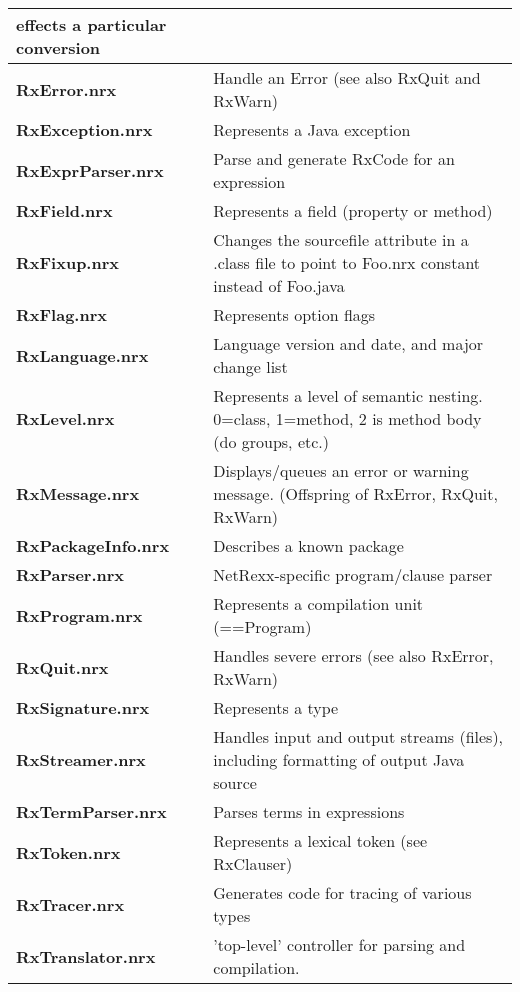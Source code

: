 \begin{table}
\begin{tabularx}{\textwidth}{>{\bfseries}lX}
                         effects a particular conversion
\\\midrule
  RxError.nrx         & Handle an Error (see also RxQuit and RxWarn)
\\\midrule
  RxException.nrx     & Represents a Java exception
\\\midrule
  RxExprParser.nrx    & Parse and generate RxCode for an expression
\\\midrule
  RxField.nrx         & Represents a field (property or method)
\\\midrule
  RxFixup.nrx         & Changes the sourcefile attribute in a .class
                         file to point to Foo.nrx constant instead of
                         Foo.java
\\\midrule
  RxFlag.nrx          & Represents option flags
\\\midrule
  RxLanguage.nrx      & Language version and date, and major change
                         list
\\\midrule
  RxLevel.nrx         & Represents a level of semantic nesting.
                         0=class, 1=method, 2  is method body (do
                         groups, etc.)
\\\midrule
  RxMessage.nrx       & Displays/queues an error or warning message.
                         (Offspring of RxError, RxQuit, RxWarn)
\\\midrule
  RxPackageInfo.nrx   & Describes a known package
\\\midrule
  RxParser.nrx        & NetRexx-specific program/clause parser
\\\midrule
  RxProgram.nrx       & Represents a compilation unit (==Program)
\\\midrule
  RxQuit.nrx          & Handles severe errors (see also RxError,
  RxWarn)
\\\midrule
  RxSignature.nrx     & Represents a type
\\\midrule
  RxStreamer.nrx      & Handles input and output streams (files),
                         including formatting of output Java source
\\\midrule
  RxTermParser.nrx    & Parses terms in expressions
\\\midrule
  RxToken.nrx         & Represents a lexical token (see RxClauser)
\\\midrule
  RxTracer.nrx        & Generates code for tracing of various types
\\\midrule
  RxTranslator.nrx    & 'top-level' controller for parsing and
                         compilation.
\\\midrule
\end{tabularx}
\end{table}
